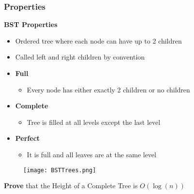 \documentclass[10pt, 
a4paper, 
oneside, 
headinclude, footinclude, 
BCOR5mm]
{scrartcl}
\begin{document}
\subsubsection{Properties}
\textbf{BST Properties}
\begin{itemize}
    \item Ordered tree where each node can have up to 2 children
    \item Called left and right children by convention
    \item \textbf{Full}
    \begin{itemize}
        \item Every node has either exactly 2 children or no children
    \end{itemize} 
    \item \textbf{Complete}
    \begin{itemize}
        \item Tree is filled at all levels except the last level
    \end{itemize} 
    \item \textbf{Perfect}
    \begin{itemize}
        \item It is full and all leaves are at the same level
    \end{itemize} 
\end{itemize}
\begin{figure}[H]
    \begin{center}
        \texttt{[image: BSTTrees.png]}
    \end{center}
\end{figure}
\textbf{Prove} that the Height of a Complete Tree is $O(\log(n))$
\end{document}
